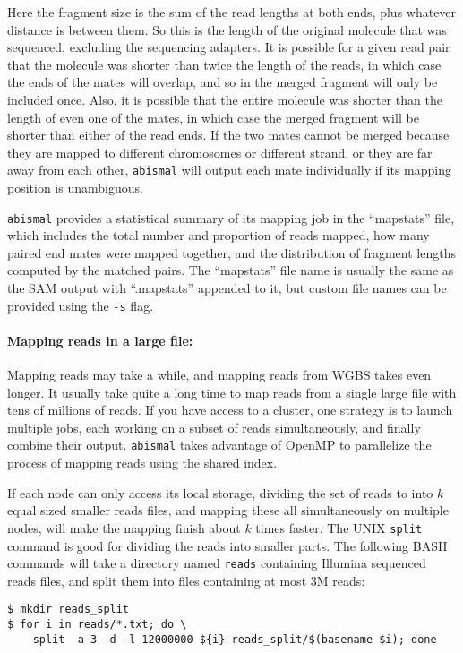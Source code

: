 \documentclass[10pt]{article}
\newcommand{\prog}[1]{\texttt{#1}}
\newcommand{\fn}[1]{\texttt{#1}}
\newcommand{\op}[1]{\texttt{#1}}
\begin{document}
Here the fragment size is the sum of the read lengths at
both ends, plus whatever distance is between them. So this is the
length of the original molecule that was sequenced, excluding the
sequencing adapters. It is possible for a given read pair that the
molecule was shorter than twice the length of the reads, in which case
the ends of the mates will overlap, and so in the merged fragment will
only be included once. Also, it is possible that the entire molecule
was shorter than the length of even one of the mates, in which case
the merged fragment will be shorter than either of the read ends. If
the two mates cannot be merged because they are mapped to different
chromosomes or different strand, or they are far away from each other,
\prog{abismal} will output each mate individually if its mapping
position is unambiguous.

\prog{abismal} provides a statistical summary
of its mapping job in the ``mapstats'' file, which includes the total
number and proportion of reads mapped, how many paired end mates were
mapped together, and the distribution of fragment lengths computed by
the matched pairs. The ``mapstats'' file name is usually the same as
the SAM output with ``.mapstats'' appended to it, but custom file
names can be provided using the \op{-s} flag.

\paragraph{Mapping reads in a large file:}
Mapping reads may take a while, and mapping reads from WGBS takes
even longer. It usually take quite a long time to map reads from a
single large file with tens of millions of reads. If you have access
to a cluster, one strategy is to launch multiple jobs, each working on
a subset of reads simultaneously, and finally combine their output.
\prog{abismal} takes advantage of OpenMP to parallelize the process of
mapping reads using the shared index.

If each node can only access its local storage, dividing the set of
reads to into $k$ equal sized smaller reads files, and mapping these
all simultaneously on multiple nodes, will make the mapping finish
about $k$ times faster.  The UNIX \prog{split} command is good for
dividing the reads into smaller parts. The following BASH commands
will take a directory named \fn{reads} containing Illumina sequenced
reads files, and split them into files containing at most 3M reads:

\begin{verbatim}
$ mkdir reads_split
$ for i in reads/*.txt; do \
    split -a 3 -d -l 12000000 ${i} reads_split/$(basename $i); done
\end{verbatim}
\end{document}
